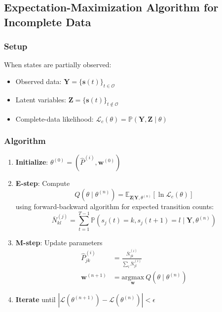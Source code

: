 \documentclass[answers,12pt,addpoints]{exam}
\begin{document}
\subsection{Expectation-Maximization Algorithm for Incomplete Data}

\subsubsection{Setup}
When states are partially observed:
\begin{itemize}
    \item Observed data: $\mathbf{Y} = \{\mathbf{s}(t)\}_{t \in \mathcal{O}}$
    \item Latent variables: $\mathbf{Z} = \{\mathbf{s}(t)\}_{t \notin \mathcal{O}}$
    \item Complete-data likelihood: $\mathcal{L}_c(\theta) = \mathbb{P}(\mathbf{Y},\mathbf{Z} \mid \theta)$
\end{itemize}

\subsubsection{Algorithm}
\begin{enumerate}
    \item \textbf{Initialize}: $\theta^{(0)} = (\hat{P}^{(i)}, \mathbf{w}^{(0)})$
    
    \item \textbf{E-step}: Compute
    \begin{equation}
    Q(\theta \mid \theta^{(n)}) = \mathbb{E}_{\mathbf{Z}|\mathbf{Y},\theta^{(n)}}[\ln \mathcal{L}_c(\theta)]
    \end{equation}
    using forward-backward algorithm for expected transition counts:
    \begin{equation}
    \bar{N}^{(j)}_{kl} = \sum_{t=1}^{T-1} \mathbb{P}(s_j(t)=k, s_j(t+1)=l \mid \mathbf{Y}, \theta^{(n)})
    \end{equation}
    
    \item \textbf{M-step}: Update parameters
    \begin{align}
    \hat{P}^{(i)}_{jk} &= \frac{\bar{N}^{(i)}_{jk}}{\sum_l \bar{N}^{(i)}_{jl}} \\
    \mathbf{w}^{(n+1)} &= \underset{\mathbf{w}}{\mathrm{argmax}}\  Q(\theta \mid \theta^{(n)})
    \end{align}
    
    \item \textbf{Iterate} until $|\mathcal{L}(\theta^{(n+1)}) - \mathcal{L}(\theta^{(n)})| < \epsilon$
\end{enumerate}
\end{document}
